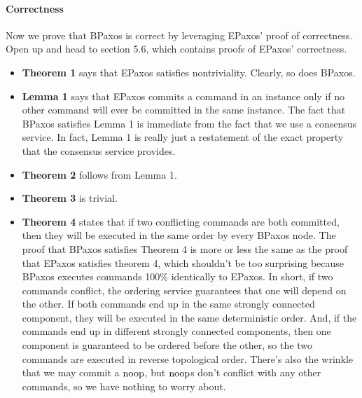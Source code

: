 \documentclass{mwhittaker}
\begin{document}
\paragraph{Correctness}
Now we prove that BPaxos is correct by leveraging EPaxos' proof of correctness.
Open up \cite{moraru2013proof} and head to section 5.6, which contains proofs
of EPaxos' correctness.
\begin{itemize}
  \item
    \textbf{Theorem 1} says that EPaxos satisfies nontriviality. Clearly, so
    does BPaxos.

  \item
    \textbf{Lemma 1} says that EPaxos commits a command in an instance only if
    no other command will ever be committed in the same instance. The fact that
    BPaxos satisfies Lemma 1 is immediate from the fact that we use a consensus
    service. In fact, Lemma 1 is really just a restatement of the exact
    property that the consensus service provides.

  \item
    \textbf{Theorem 2} follows from Lemma 1.

  \item
    \textbf{Theorem 3} is trivial.

  \item
    \textbf{Theorem 4} states that if two conflicting commands are both
    committed, then they will be executed in the same order by every BPaxos
    node. The proof that BPaxos satisfies Theorem 4 is more or less the same as
    the proof that EPaxos satisfies theorem 4, which shouldn't be too
    surprising because BPaxos executes commands 100\% identically to EPaxos. In
    short, if two commands conflict, the ordering service guarantees that one
    will depend on the other. If both commands end up in the same strongly
    connected component, they will be executed in the same deterministic order.
    And, if the commands end up in different strongly connected components,
    then one component is guaranteed to be ordered before the other, so the two
    commands are executed in reverse topological order. There's also the
    wrinkle that we may commit a $\text{noop}$, but $\text{noop}$s don't conflict with any
    other commands, so we have nothing to worry about.
\end{itemize}
\end{document}
